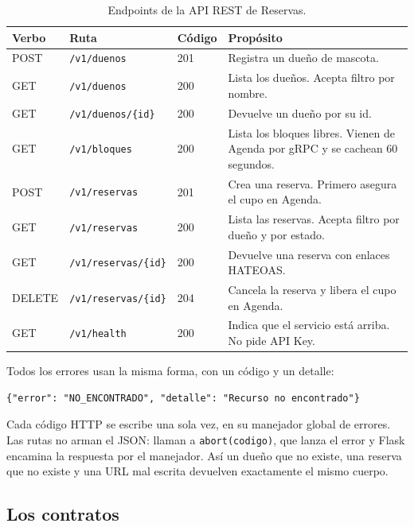 \documentclass[12pt, a4paper]{article}
\begin{document}
\begin{table}[H]
\centering
\caption{Endpoints de la API REST de Reservas.}
\label{tab:rest}
\begin{tabular}{@{}p{1.2cm}p{4.4cm}p{1.6cm}p{5.5cm}@{}}
\toprule
\textbf{Verbo} & \textbf{Ruta} & \textbf{Código} & \textbf{Propósito} \\
\midrule
POST & \texttt{/v1/duenos} & 201 & Registra un dueño de mascota. \\
GET & \texttt{/v1/duenos} & 200 & Lista los dueños. Acepta filtro por nombre. \\
GET & \texttt{/v1/duenos/\{id\}} & 200 & Devuelve un dueño por su id. \\
\addlinespace
GET & \texttt{/v1/bloques} & 200 & Lista los bloques libres. Vienen de Agenda
por gRPC y se cachean 60 segundos. \\
\addlinespace
POST & \texttt{/v1/reservas} & 201 & Crea una reserva. Primero asegura el cupo
en Agenda. \\
GET & \texttt{/v1/reservas} & 200 & Lista las reservas. Acepta filtro por dueño
y por estado. \\
GET & \texttt{/v1/reservas/\{id\}} & 200 & Devuelve una reserva con enlaces
HATEOAS. \\
DELETE & \texttt{/v1/reservas/\{id\}} & 204 & Cancela la reserva y libera el cupo
en Agenda. \\
\addlinespace
GET & \texttt{/v1/health} & 200 & Indica que el servicio está arriba. No pide
API Key. \\
\bottomrule
\end{tabular}
\end{table}

Todos los errores usan la misma forma, con un código y un detalle:

\begin{lstlisting}[caption={Formato único de error.}]
{"error": "NO_ENCONTRADO", "detalle": "Recurso no encontrado"}
\end{lstlisting}

Cada código HTTP se escribe una sola vez, en su manejador global de
errores. Las rutas no arman el JSON: llaman a \texttt{abort(codigo)}, que
lanza el error y Flask encamina la respuesta por el manejador. Así un
dueño que no existe, una reserva que no existe y una URL mal escrita
devuelven exactamente el mismo cuerpo.

\subsection{Los contratos}
\end{document}

